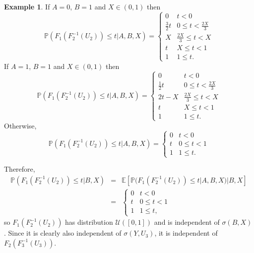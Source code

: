 \documentclass[aap]{imsart}
\theoremstyle{plain}
\theoremstyle{definition}
\newtheorem{example}[theorem]{Example}
\begin{document}
\begin{example}
If $A = 0$, $B = 1$ and $X \in (0,1)$ then
\begin{equation*}
  \mathbb{P}(F_1(F_2^{-1}(U_2)) \leq t|A, B, X) = \begin{cases}
    0            & t < 0 \\
    \frac{3}{2}t & 0 \leq t < \frac{2X}{3} \\
    X            & \frac{2X}{3} \leq t < X \\
    t            & X \leq t < 1 \\
    1            & 1 \leq t.
  \end{cases}
\end{equation*}
If $A = 1$, $B = 1$ and $X \in (0,1)$ then
\begin{equation*}
  \mathbb{P}(F_1(F_2^{-1}(U_2)) \leq t|A, B, X) = \begin{cases}
    0            & t < 0 \\
    \frac{1}{2}t & 0 \leq t < \frac{2X}{3} \\
    2t - X       & \frac{2X}{3} \leq t < X \\
    t            & X \leq t < 1 \\
    1            & 1 \leq t.
  \end{cases}
\end{equation*}
Otherwise,
\begin{equation*}
  \mathbb{P}(F_1(F_2^{-1}(U_2)) \leq t|A, B, X) = \begin{cases}
    0 & t < 0 \\
    t & 0 \leq t < 1 \\
    1 & 1 \leq t.
  \end{cases}
\end{equation*}

Therefore,
\begin{eqnarray*}
  \mathbb{P}(F_1(F_2^{-1}(U_2)) \leq t|B, X) & = & \mathbb{E}[\mathbb{P}(F_1(F_2^{-1}(U_2)) \leq t|A, B, X)|B, X] \\
                                             & = & \begin{cases}
                                               0 & t < 0 \\
                                               t & 0 \leq t < 1 \\
                                               1 & 1 \leq t,
                                             \end{cases}
\end{eqnarray*}
so $F_1(F_2^{-1}(U_2))$ has distribution $\mathcal{U}([0,1])$ and is independent of $\sigma(B,X)$. Since it is clearly also independent of $\sigma(Y,U_3)$, it is independent of $F_2(F_3^{-1}(U_3))$.


\end{example}
\end{document}
